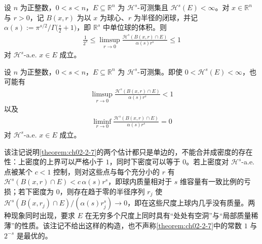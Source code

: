 \documentclass[../../main.tex]{subfiles}%
\begin{document}
\begin{theorem}[$E$ 中的点的密度界]\label{theorem:ch02-2-7}
设 $n$ 为正整数，$0<s<n$，$E\subseteq\mathbb{R}^n$ 为 $\mathcal{H}^s$-可测集且 $\mathcal{H}^s(E)<\infty$。对 $x\in\mathbb{R}^n$ 与 $r>0$，记 $B(x,r)$ 为以 $x$ 为球心、$r$ 为半径的闭球，并记 $\alpha(s):=\pi^{s/2}\big/\Gamma\bigl(\frac{s}{2}+1\bigr)$，即 $\mathbb{R}^s$ 中单位球的体积。则
\begin{align*}
\frac{1}{2^s}\leqslant\limsup_{r\to0}\frac{\mathcal{H}^s(B(x,r)\cap E)}{\alpha(s)r^s}\leqslant1
\end{align*}
对 $\mathcal{H}^s$-a.e. $x\in E$ 成立。
\end{theorem}

\begin{remark}\label{remark:ch02-thm-2-7-边界}
设 $n$ 为正整数，$0<s<n$，$E\subseteq\mathbb{R}^n$ 为 $\mathcal{H}^s$-可测集。即使 $0<\mathcal{H}^s(E)<\infty$，也可能有
\begin{align*}
\limsup_{r\to0}\frac{\mathcal{H}^s(B(x,r)\cap E)}{\alpha(s)r^s}<1
\end{align*}
以及
\begin{align*}
\liminf_{r\to0}\frac{\mathcal{H}^s(B(x,r)\cap E)}{\alpha(s)r^s}=0
\end{align*}
对 $\mathcal{H}^s$-a.e. $x\in E$ 成立。
\end{remark}

\begin{remark}\label{remark:ch02-thm-2-7-密度存在性}
该注记说明\cref{theorem:ch02-2-7}的两个估计都只是单边的，不能合并成密度的存在性：上密度的上界可以严格小于 $1$，同时下密度可以等于 $0$。若上密度对 $\mathcal{H}^s$-a.e. 点被某个 $c<1$ 控制，则对这些点与每个充分小的 $r$ 有 $\mathcal{H}^s(B(x,r)\cap E)<c\,\alpha(s)r^s$，即球内质量相对于 $s$ 维容量有一致比例的亏损；若下密度为 $0$，则存在趋于零的半径序列 $r_j$ 使 $\mathcal{H}^s(B(x,r_j)\cap E)/(\alpha(s)r_j^s)\to0$，即在这些尺度上球内几乎没有质量。两种现象同时出现，要求 $E$ 在无穷多个尺度上同时具有“处处有空洞”与“局部质量稀薄”的性质。该注记不给出这样的构造，也不声称\cref{theorem:ch02-2-7}中的常数 $1$ 与 $2^{-s}$ 是最优的。%
\end{remark}
\end{document}

